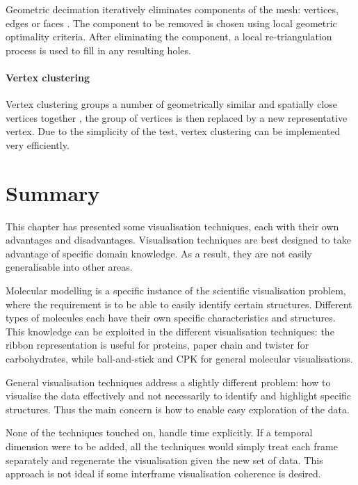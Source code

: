 Geometric decimation iteratively eliminates components of the mesh: vertices,
edges or faces \citep{schroeder92}. The component to be removed is chosen using
local geometric optimality criteria. After eliminating the component, a local
re-triangulation process is used to fill in any resulting holes.


\paragraph{Vertex clustering}

Vertex clustering groups a number of geometrically similar and spatially close
vertices together \citep{rossignac93}, the group of vertices is then replaced
by a new representative vertex. Due to the simplicity of the test, vertex
clustering can be implemented very efficiently.



\section{Summary}
\label{sec:background_summary}

This chapter has presented some visualisation techniques, each with their own
advantages and disadvantages. Visualisation techniques are best designed to
take advantage of specific domain knowledge. As a result, they are not easily
generalisable into other areas.

Molecular modelling is a specific instance of the scientific visualisation
problem, where the requirement is to be able to easily identify certain
structures. Different types of molecules each have their own specific
characteristics and structures. This knowledge can be exploited in the
different visualisation techniques: the ribbon representation is useful for
proteins, paper chain and twister for carbohydrates, while ball-and-stick and
CPK for general molecular visualisations.

General visualisation techniques address a slightly different problem: how to
visualise the data effectively and not necessarily to identify and highlight
specific structures. Thus the main concern is how to enable easy exploration of
the data.

None of the techniques touched on, handle time explicitly. If a temporal
dimension were to be added, all the techniques would simply treat each frame
separately and regenerate the visualisation given the new set of data. This
approach is not ideal if some interframe visualisation coherence is desired.


